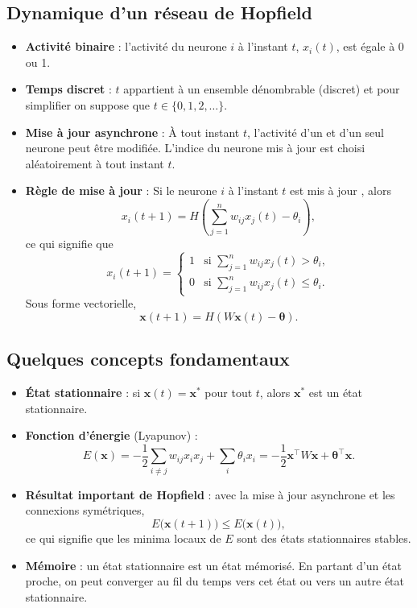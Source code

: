 \documentclass[12pt, letterpaper]{article}
\numberwithin{table}{section}
\numberwithin{figure}{section}
\numberwithin{equation}{section}
\begin{document}
\subsection{Dynamique d'un réseau de Hopfield}\label{subsec:dynamique-d'un-reseau-de-hopfield}
\begin{itemize}[label=\textbullet]
    \item \textbf{Activité binaire} : l'activité du neurone $i$ à l'instant $t$, $x_i(t)$, est égale à 0 ou 1.
    \item \textbf{Temps discret} : $t$ appartient à un ensemble dénombrable (discret) et pour simplifier on suppose
    que $t\in\{0,1,2,\ldots\}$.
    \item \textbf{Mise à jour asynchrone} : À tout instant $t$, l'activité d'un et d'un seul neurone peut être modifiée.
    L'indice du neurone mis à jour est choisi aléatoirement à tout instant $t$.
    \item \textbf{Règle de mise à jour} : Si le neurone $i$ à l'instant $t$ est mis à jour , alors
    \[
    x_i(t+1) = H\left(\sum_{j=1}^nw_{ij}x_j(t)-\theta_i\right),
    \]
    ce qui signifie que
    \[
    x_i(t+1) =
    \begin{cases}
    1 & \text{si }\sum_{j=1}^nw_{ij}x_j(t)>\theta_i, \\
    0 & \text{si }\sum_{j=1}^nw_{ij}x_j(t)\leq\theta_i .
    \end{cases}
    \]
    Sous forme vectorielle,
    \[
    \mathbf{x}(t+1) = H\left(W \mathbf{x}(t)-\boldsymbol{\theta}\right).
    \]
\end{itemize}

\subsection{Quelques concepts fondamentaux}
\begin{itemize}[label=\textbullet]
    \item \textbf{État stationnaire} : si $\mathbf{x}(t)= \mathbf{x}^*$ pour tout $t$, alors $\mathbf{x}^*$ est un
    état stationnaire.
    \item \textbf{Fonction d'énergie} (Lyapunov) :
    \[
    E(\mathbf{x}) = -\frac{1}{2}\sum_{i\neq j} w_{ij}x_ix_j +\sum_i\theta_ix_i=-\frac{1}{2}\mathbf{x}^\top W \mathbf{x} + \boldsymbol{\theta}^\top \mathbf{x}.
    \]
    \item \textbf{Résultat important de Hopfield} : avec la mise à jour asynchrone et les connexions symétriques,
    \[
    E\big(\mathbf{x}(t+1)\big) \leq E\big(\mathbf{x}(t)\big),
    \]
    ce qui signifie que les minima locaux de $E$ sont des états stationnaires stables.
    \item \textbf{Mémoire} : un état stationnaire est un état mémorisé.
    En partant d'un état proche, on peut converger au fil du temps vers cet état ou vers un autre état stationnaire.
\end{itemize}
\end{document}
